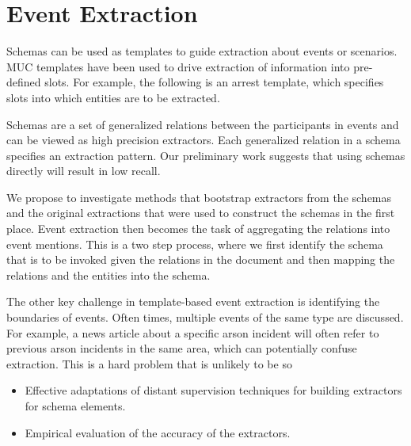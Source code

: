 \section{Event Extraction}

Schemas can be used as templates to guide extraction about events or scenarios. MUC templates have been used to drive extraction of information into pre-defined slots. For example, the following is an arrest template, which specifies slots into which entities are to be extracted.

Schemas are a set of generalized relations between the participants in events and can be viewed as high precision extractors. Each generalized relation in a schema specifies an extraction pattern. Our preliminary work suggests that using schemas directly will result in low recall. 

We propose to investigate methods that bootstrap extractors from the schemas and the original extractions that were used to construct the schemas in the first place. Event extraction then becomes the task of aggregating the relations into event mentions. This is a two step process, where we first identify the schema that is to be invoked given the relations in the document and then mapping the relations and the entities into the schema. 



The other key challenge in template-based event extraction is identifying the boundaries of events. Often times, multiple events of the same type are discussed. For example, a news article about a specific arson incident will often refer to previous arson incidents in the same area, which can potentially confuse extraction. This is a hard problem that is unlikely to be so




\begin{itemize}
\item Effective adaptations of distant supervision techniques for building extractors for schema elements.
\item Empirical evaluation of the accuracy of the extractors. 
\end{itemize}

